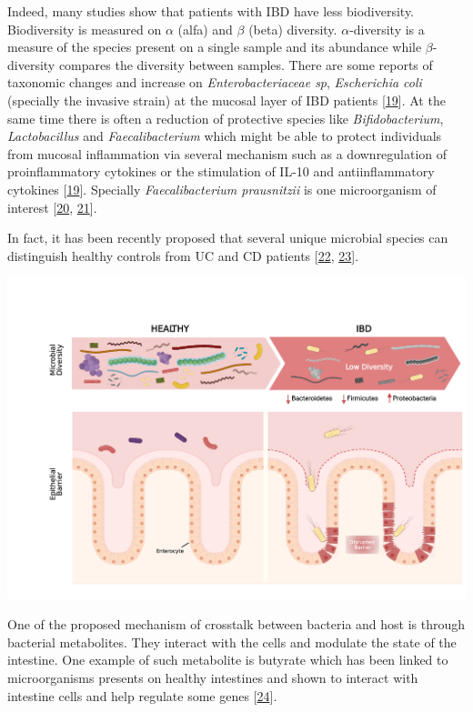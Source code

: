 \documentclass[
  12pt,
  a4paper,
  twoside,
  openright]{book}
\let\origfigure\figure
\let\endorigfigure\endfigure
\renewenvironment{figure}[1][2] {
    \expandafter\origfigure\expandafter[!ht]
} {
    \endorigfigure
}
\begin{document}
Indeed, many studies show that patients with IBD have less biodiversity.
Biodiversity is measured on \(\alpha\) (alfa) and \(\beta\) (beta) diversity.
\(\alpha\)-diversity is a measure of the species present on a single sample and its abundance while \(\beta\)-diversity compares the diversity between samples.
There are some reports of taxonomic changes and increase on \emph{Enterobacteriaceae sp}, \emph{Escherichia coli} (specially the invasive strain) at the mucosal layer of IBD patients {[}\protect\hyperlink{ref-ott2004}{19}{]}.
At the same time there is often a reduction of protective species like \emph{Bifidobacterium}, \emph{Lactobacillus} and \emph{Faecalibacterium} which might be able to protect individuals from mucosal inflammation via several mechanism such as a downregulation of proinflammatory cytokines or the stimulation of IL-10 and antiinflammatory cytokines {[}\protect\hyperlink{ref-ott2004}{19}{]}.
Specially \emph{Faecalibacterium prausnitzii} is one microorganism of interest {[}\protect\hyperlink{ref-kostic2014}{20}, \protect\hyperlink{ref-sender2016}{21}{]}.

In fact, it has been recently proposed that several unique microbial species can distinguish healthy controls from UC and CD patients {[}\protect\hyperlink{ref-sankarasubramanian2020}{22}, \protect\hyperlink{ref-lopez-siles2014}{23}{]}.

\begin{figure}
\includegraphics[width=1\linewidth]{images/tesis_AM_Figure2} \caption{The microbial composition in a healthy and IBD gut.}\label{fig:composition}
\end{figure}

One of the proposed mechanism of crosstalk between bacteria and host is through bacterial metabolites.
They interact with the cells and modulate the state of the intestine.
One example of such metabolite is butyrate which has been linked to microorganisms presents on healthy intestines and shown to interact with intestine cells and help regulate some genes {[}\protect\hyperlink{ref-ferrer-picuxf3n2020}{24}{]}.
\end{document}
